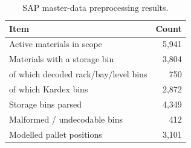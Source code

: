 \begin{table}[htbp]
\centering
\caption{SAP master-data preprocessing results.}
\label{tab:preprocess}
\begin{tabular}{lr}
\toprule
Item & Count \\
\midrule
Active materials in scope & 5,941 \\
Materials with a storage bin & 3,804 \\
\quad of which decoded rack/bay/level bins & 750 \\
\quad of which Kardex bins & 2,872 \\
Storage bins parsed & 4,349 \\
Malformed / undecodable bins & 412 \\
Modelled pallet positions & 3,101 \\
\bottomrule
\end{tabular}
\end{table}
